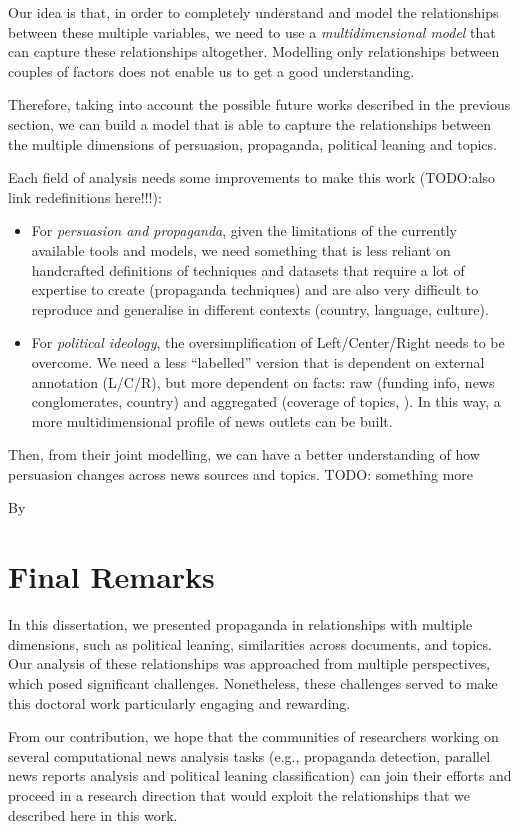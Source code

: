 Our idea is that, in order to completely understand and model the relationships between these multiple variables, we need to use a \emph{multidimensional model} that can capture these relationships altogether. Modelling only relationships between couples of factors does not enable us to get a good understanding.

Therefore, taking into account the possible future works described in the previous section, we can build a model that is able to capture the relationships between the multiple dimensions of persuasion, propaganda, political leaning and topics.

Each field of analysis needs some improvements to make this work
(TODO:also link redefinitions here!!!):
\begin{itemize}
    \item For \emph{persuasion and propaganda}, given the limitations of the currently available tools and models, we need something that is less reliant on handcrafted definitions of techniques and datasets that require a lot of expertise to create (propaganda techniques) and are also very difficult to reproduce and generalise in different contexts (country, language, culture).

    \item For \emph{political ideology}, the oversimplification of Left/Center/Right needs to be overcome. We need a less “labelled” version that is dependent on external annotation (L/C/R), but more dependent on facts: raw (funding info, news conglomerates, country) and aggregated (coverage of topics, ). In this way, a more multidimensional profile of news outlets can be built.
\end{itemize}

Then, from their joint modelling, we can have a better understanding of how persuasion changes across news sources and topics. TODO: something more

By




\section{\statusgreen Final Remarks}
\label{sec:discussion_conclusions}

In this dissertation, we presented propaganda in relationships with multiple dimensions, such as political leaning, similarities across documents, and topics. Our analysis of these relationships was approached from multiple perspectives, which posed significant challenges. Nonetheless, these challenges served to make this doctoral work particularly engaging and rewarding.

From our contribution, we hope that the communities of researchers working on several computational news analysis tasks (e.g., propaganda detection, parallel news reports analysis and political leaning classification) can join their efforts and proceed in a research direction that would exploit the relationships that we described here in this work.
